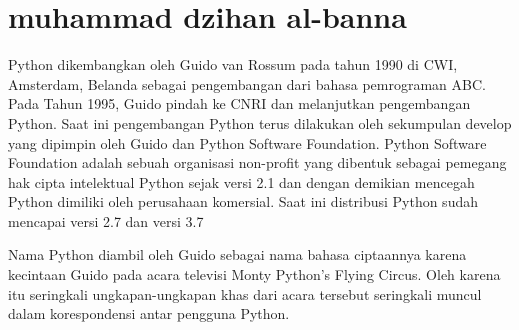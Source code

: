 \section{muhammad dzihan al-banna}
Python dikembangkan oleh Guido van Rossum pada tahun 1990 di CWI, Amsterdam, Belanda sebagai pengembangan dari bahasa pemrograman ABC.
Pada Tahun 1995, Guido pindah ke CNRI dan melanjutkan pengembangan Python. Saat ini pengembangan Python terus dilakukan oleh sekumpulan develop yang dipimpin oleh Guido dan Python Software Foundation. Python Software Foundation adalah sebuah organisasi non-profit yang dibentuk sebagai pemegang hak cipta intelektual Python sejak versi 2.1 dan dengan demikian mencegah Python dimiliki oleh perusahaan komersial. Saat ini distribusi Python sudah mencapai versi 2.7 dan versi 3.7

Nama Python diambil oleh Guido sebagai nama bahasa ciptaannya karena kecintaan Guido pada acara televisi Monty Python’s Flying Circus. Oleh karena itu seringkali ungkapan-ungkapan khas dari acara tersebut seringkali muncul dalam korespondensi antar pengguna Python.
